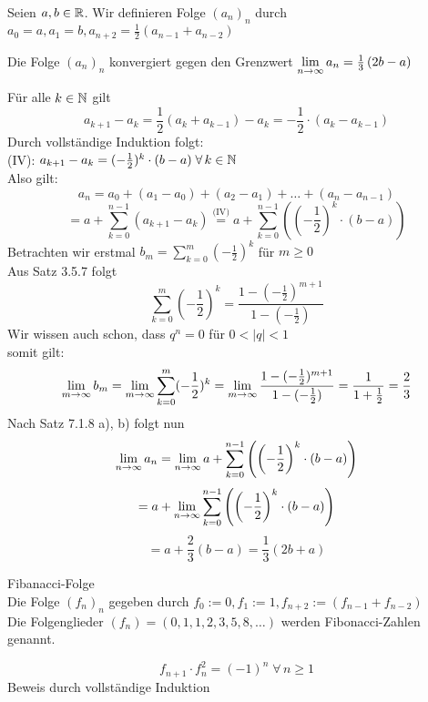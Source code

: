 \documentclass[../ana1u.tex]{subfiles}
\begin{document}
\begin{bsp} 
    Seien \(a, b \in \mathbb{R}\). Wir definieren Folge \((a_n)_n\) durch \(a_0 = a, a_1 = b, a_{n+2} = \frac{1}{2}\left(a_{n-1} + a_{n-2}\right)\)\\
    \begin{beh}
        Die Folge \((a_n)_n\) konvergiert gegen den Grenzwert \(\lim\limits_{n\rightarrow\infty} a_n = \frac{1}{3}\left(2b - a\right)\)
    \end{beh}
    \begin{bew}
        Für alle \(k \in \mathbb{N}\) gilt
        \[a_{k+1} - a_k = \frac{1}{2}\left(a_{k} + a_{k-1}\right) - a_k = -\frac{1}{2} \cdot (a_k - a_{k-1})\]
        Durch vollständige Induktion folgt:\\
        (IV): \(a_{k+1} - a_k =  (-\frac{1}{2})^k \cdot (b - a) \; \forall \, k \in \mathbb{N}\)\\
        Also gilt:
        \[a_n = a_0 + (a_1 - a_0) + (a_2 - a_1) + \dots + (a_n - a_{n-1}) \]
        \[= a + \sum_{k=0}^{n-1}(a_{k+1} - a_k) \overset{\text{(IV)}}{=} a 
        + \sum_{k=0}^{n-1} \left(\left(-\frac{1}{2}\right)^k \cdot (b - a)\right) \]
        Betrachten wir erstmal \(b_m = \sum_{k=0}^{m} (-\frac{1}{2})^k\) für \(m \geq 0\)\\
        Aus Satz 3.5.7 folgt
        \[\sum_{k=0}^{m} (-\frac{1}{2})^k = \frac{1-(-\frac{1}{2})^{m+1}}{1-(-\frac{1}{2})}\]
        Wir wissen auch schon, dass \(q^n = 0\) für \(0 < |q| < 1\)\\
        somit gilt:
        \[\lim\limits_{m\rightarrow\infty} b_m = \lim\limits_{m\rightarrow\infty} \sum_{k=0}^{m} (-\frac{1}{2})^k = \lim\limits_{m\rightarrow\infty} \frac{1-(-\frac{1}{2})^{m+1}}{1-(-\frac{1}{2})} = \frac{1}{1 + \frac{1}{2}} = \frac{2}{3}\]
        Nach Satz 7.1.8 a), b) folgt nun
        \[\lim\limits_{n\rightarrow\infty} a_n = \lim\limits_{n\rightarrow\infty} a + \sum_{k=0}^{n-1} \left(\left(-\frac{1}{2}\right)^k 
        \cdot (b - a)\right) \]
        \[= a + \lim\limits_{n\rightarrow\infty} \sum_{k=0}^{n-1} \left(\left(-\frac{1}{2}\right)^k 
        \cdot (b - a)\right)\]
        \[= a + \frac{2}{3}(b - a) = \frac{1}{3}(2b + a)\]
    \end{bew}
\end{bsp}
\begin{defi}
    Fibanacci-Folge\\
    Die Folge \((f_n)_n\) gegeben durch \(f_0 := 0, f_1 := 1, f_{n+2} := (f_{n-1} + f_{n-2})\)\\
    Die Folgenglieder \((f_n) = (0, 1, 1, 2, 3, 5, 8, \dots)\) werden Fibonacci-Zahlen genannt.
\end{defi}
\begin{beh}[1]
    \[f_{n+1} \cdot f_n^2 = (-1)^n \; \forall \, n \geq 1\]
    Beweis durch vollständige Induktion
\end{beh}
\end{document}

